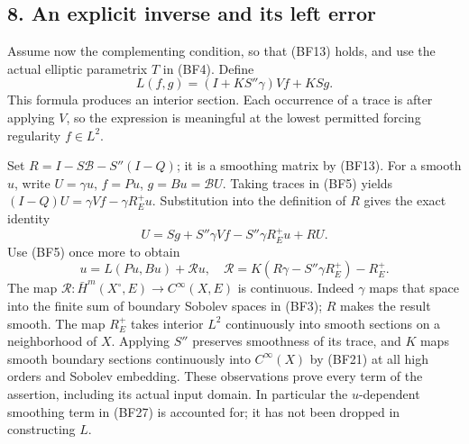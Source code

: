 \documentclass[
  11pt,
]{article}
\makeatletter
\let\ReaderOriginalAnchorStart\hyper@anchorstart
\let\ReaderOriginalAnchorEnd\hyper@anchorend
\let\ReaderPendingAliases\@empty
\def\ReaderArmAliases#1{\gdef\ReaderPendingAliases{#1}}
\def\hyper@anchorstart#1{\ReaderIfNativeAnchorTF{#1}{\ReaderPendingAliases\global\let\ReaderPendingAliases\@empty}{}\ReaderOriginalAnchorStart{#1}}
\makeatother
\begin{document}
\subsection{8. An explicit inverse and its left
error}\label{an-explicit-inverse-and-its-left-error}

Assume now the complementing condition, so that (BF13) holds, and use
the actual elliptic parametrix \(T\) in (BF4). Define \[
 L(f,g)=(I+KS''\gamma)Vf+KSg.
 \tag{BF26}
\] This formula produces an interior section. Each occurrence of a trace
is after applying \(V\), so the expression is meaningful at the lowest
permitted forcing regularity \(f\in L^2\).

Set \(R=I-S\mathcal B-S''(I-Q)\); it is a smoothing matrix by (BF13).
For a smooth \(u\), write \(U=\gamma u\), \(f=Pu\),
\(g=Bu=\mathcal BU\). Taking traces in (BF5) yields
\((I-Q)U=\gamma Vf-\gamma R_E^+u\). Substitution into the definition of
\(R\) gives the exact identity \[
 U=Sg+S''\gamma Vf-S''\gamma R_E^+u+RU.
 \tag{BF27}
\] Use (BF5) once more to obtain \[
 u=L(Pu,Bu)+\mathcal R u,
 \quad
 \mathcal R=K(R\gamma-S''\gamma R_E^+)-R_E^+.
 \tag{BF28}
\] The map \(\mathcal R:\bar H^m(X^\circ,E)\to C^\infty(X,E)\) is
continuous. Indeed \(\gamma\) maps that space into the finite sum of
boundary Sobolev spaces in (BF3); \(R\) makes the result smooth. The map
\(R_E^+\) takes interior \(L^2\) continuously into smooth sections on a
neighborhood of \(X\). Applying \(S''\) preserves smoothness of its
trace, and \(K\) maps smooth boundary sections continuously into
\(C^\infty(X)\) by (BF21) at all high orders and Sobolev embedding.
These observations prove every term of the assertion, including its
actual input domain. In particular the \(u\)-dependent smoothing term in
(BF27) is accounted for; it has not been dropped in constructing \(L\).

\ReaderArmAliases{\ReaderOriginalAnchorStart{AN03-GFB-009}\ReaderOriginalAnchorEnd\begingroup\expandafter\def\csname @currentHref\endcsname{AN03-GFB-009}\label{AN03-GFB-009}\endgroup\ReaderOriginalAnchorStart{an03-gfb-009-both-rows-of-the-right-error}\ReaderOriginalAnchorEnd\begingroup\expandafter\def\csname @currentHref\endcsname{an03-gfb-009-both-rows-of-the-right-error}\label{an03-gfb-009-both-rows-of-the-right-error}\endgroup\ReaderOriginalAnchorStart{9-both-rows-of-the-right-error}\ReaderOriginalAnchorEnd\begingroup\expandafter\def\csname @currentHref\endcsname{9-both-rows-of-the-right-error}\label{9-both-rows-of-the-right-error}\endgroup\ReaderOriginalAnchorStart{both-rows-of-the-right-error}\ReaderOriginalAnchorEnd}
\end{document}
